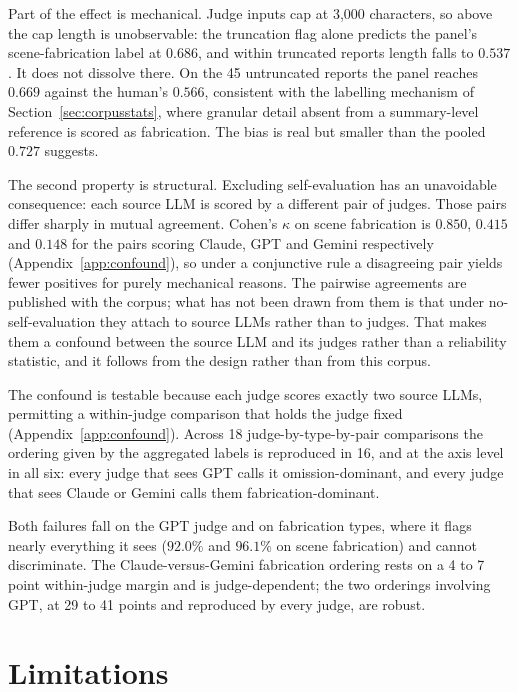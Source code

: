 \documentclass{article}
\begin{document}
Part of the effect is mechanical. Judge inputs cap at 3{,}000 characters, so
above the cap length is unobservable: the truncation flag alone predicts the
panel's scene-fabrication label at $0.686$, and within truncated reports length
falls to $0.537$. It does not dissolve there. On the 45 untruncated reports the
panel reaches $0.669$ against the human's $0.566$, consistent with the
labelling mechanism of Section~\ref{sec:corpusstats}, where granular detail
absent from a summary-level reference is scored as fabrication. The bias is
real but smaller than the pooled $0.727$ suggests.




\label{sec:confound}
The second property is structural. Excluding self-evaluation has an
unavoidable consequence: each source LLM is scored by a different pair of
judges. Those pairs differ sharply in mutual
agreement. Cohen's $\kappa$ on scene fabrication is $0.850$, $0.415$ and
$0.148$ for the pairs scoring Claude, GPT and Gemini respectively
(Appendix~\ref{app:confound}), so under a conjunctive rule a disagreeing pair
yields fewer positives for purely mechanical reasons. The pairwise agreements
are published with the corpus; what has not been drawn from them is that under
no-self-evaluation they attach to source LLMs rather than to judges. That makes
them a confound between the source LLM and its judges rather than a reliability
statistic, and it follows from the design rather than from this corpus.

The confound is testable because each judge scores exactly two source LLMs,
permitting a within-judge comparison that holds the judge fixed
(Appendix~\ref{app:confound}). Across 18 judge-by-type-by-pair comparisons the ordering
given by the aggregated labels is reproduced in 16, and at the axis level in
all six: every judge that sees GPT calls it omission-dominant, and every judge
that sees Claude or Gemini calls them fabrication-dominant.

Both failures fall on the GPT judge and on fabrication types, where it flags
nearly everything it sees ($92.0\%$ and $96.1\%$ on scene fabrication) and
cannot discriminate. The Claude-versus-Gemini fabrication ordering rests on a 4
to 7 point within-judge margin and is judge-dependent; the two orderings
involving GPT, at 29 to 41 points and reproduced by every judge, are robust.

\section{Limitations}
\end{document}
